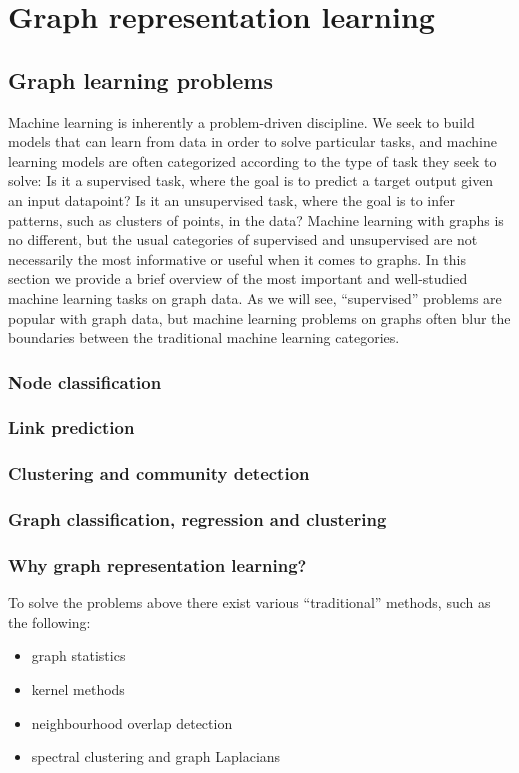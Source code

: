 \chapter{Graph representation learning}\label{grl}

\section{Graph learning problems}
Machine learning is inherently a problem-driven discipline. We seek to build models that can learn from data in order to solve particular tasks, and machine learning models are often categorized according to the type of task they seek
to solve: Is it a supervised task, where the goal is to predict a target output given an input datapoint? Is it an unsupervised task, where the goal is to infer
patterns, such as clusters of points, in the data? Machine learning with graphs is no different, but the usual categories of
supervised and unsupervised are not necessarily the most informative or useful when it comes to graphs. In this section we provide a brief overview of the most
important and well-studied machine learning tasks on graph data. As we will see, “supervised” problems are popular with graph data, but machine learning problems on graphs often blur the boundaries between the traditional machine
learning categories.\

\subsection{Node classification}

\subsection{Link prediction}

\subsection{Clustering and community detection}

\subsection{Graph classification, regression and clustering}

\subsection{Why graph representation learning?}
To solve the problems above there exist various ``traditional'' methods, such as the following:
\begin{itemize}
    \item graph statistics
    \item kernel methods
    \item neighbourhood overlap detection
    \item spectral clustering and graph Laplacians
\end{itemize}




